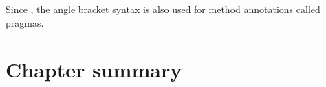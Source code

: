 \documentclass[a4paper,10pt,twoside]{book}
\begin{document}



Since , the angle bracket syntax is also used for method annotations called pragmas.

\section{Chapter summary}
\end{document}
